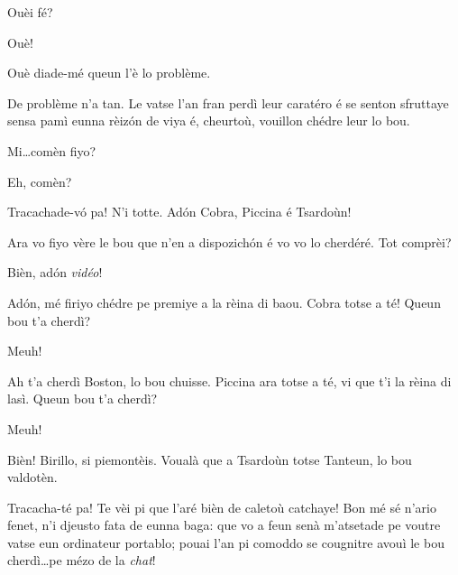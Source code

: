 \begin{drama}
\Cienspeaks Ouèi fé?

\Schulzspeaks Ouè!


\Cienspeaks {} Ouè diade-mé queun l’è lo problème.

\Schulzspeaks De problème n’a tan. Le vatse l’an fran perdì leur caratéro é se senton sfruttaye sensa pamì eunna rèiz\'on de viya é, cheurtoù, vouillon chédre leur lo bou.

\Cienspeaks Mi\ldots comèn fiyo?

\Mariettospeaks{} Eh, comèn?

\Schulzspeaks Tracachade-v\'o pa! N’i totte. Ad\'on   Cobra, Piccina é Tsardoùn!


\Schulzspeaks Ara vo fiyo vère le bou que n’en a dispozich\'on é vo vo lo cherdéré. Tot comprèi?


\Schulzspeaks Bièn, ad\'on \textit{vidéo}!



\Schulzspeaks Ad\'on, mé firiyo chédre pe premiye a la rèina di baou. Cobra totse a té! Queun bou t'a cherdì?

\Cobraspeaks{} Meuh!

\Schulzspeaks Ah t’a cherdì Boston, lo bou chuisse. Piccina ara totse a té, vi que t’i la rèina di lasì. Queun bou t'a cherdì?

\Piccinaspeaks{} Meuh!

\Schulzspeaks Bièn! Birillo, si piemontèis. Voualà que a Tsardoùn totse Tanteun, lo bou valdotèn.


\Schulzspeaks{} Tracacha-té pa! Te vèi pi que l'aré bièn de caletoù catchaye!  Bon mé sé n'ario fenet, n'i djeusto fata de eunna baga: que vo a feun senà m'a\-tse\-tade pe voutre vatse eun ordinateur portablo; pouai l'an pi comoddo se cougnitre avouì le bou cherdì\ldots pe mézo de la \textit{chat}!


\end{drama}
